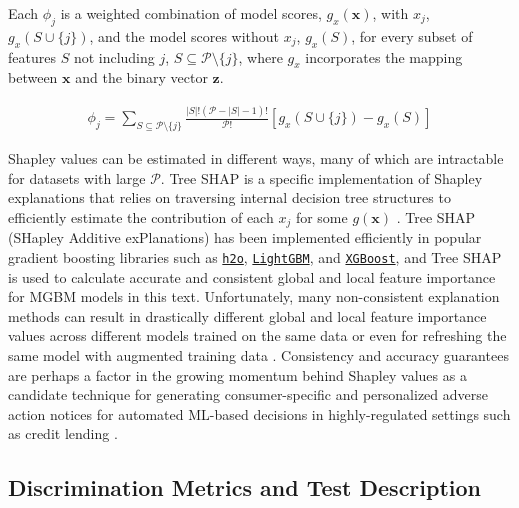 \documentclass[information,article,submit,moreauthors,pdftex]{definitions/mdpi}
\begin{document}
Each $\phi_j$ is a weighted combination of model scores, $g_x(\mathbf{x})$, with $x_j$, $g_x(S \cup \{j\})$, and the model scores without $x_j$, $g_x(S)$, for every subset of features $S$ not including $j$, $S \subseteq \mathcal{P} \setminus \{j\}$, where $g_x$ incorporates the mapping between $\mathbf{x}$ and the binary vector $\mathbf{z}$. 

\begin{equation}
\label{eq:shap_contrib}
\begin{aligned}
\phi_{j} = \sum_{S \subseteq \mathcal{P} \setminus \{j\}}\frac{|S|!(\mathcal{P} -|S| -1)!}{\mathcal{P}!}[g_x(S \cup \{j\}) - g_x(S)]
\end{aligned}
\end{equation}

Shapley values can be estimated in different ways, many of which are intractable for datasets with large $\mathcal{P}$. Tree SHAP is a specific implementation of Shapley explanations that relies on traversing internal decision tree structures to efficiently estimate the contribution of each $x_j$ for some $g(\mathbf{x})$ \cite{tree_shap}. Tree SHAP (SHapley Additive exPlanations) has been implemented efficiently in popular gradient boosting libraries such as \href{http://docs.h2o.ai/h2o/latest-stable/h2o-py/docs/modeling.html#h2ogradientboostingestimator}{\texttt{h2o}}, \href{https://lightgbm.readthedocs.io/en/latest/Python-Intro.html}{\texttt{LightGBM}}, and \href{https://xgboost.readthedocs.io/en/latest/python/python_intro.html}{\texttt{XGBoost}}, and Tree SHAP is used to calculate accurate and consistent global and local feature importance for MGBM models in this text. Unfortunately, many non-consistent explanation methods can result in drastically different global and local feature importance values across different models trained on the same data or even for refreshing the same model with augmented training data \cite{molnar}. Consistency and accuracy guarantees are perhaps a factor in the growing momentum behind Shapley values as a candidate technique for generating consumer-specific and personalized adverse action notices for automated ML-based decisions in highly-regulated settings such as credit lending \cite{bracke2019machine}.

\subsection{Discrimination Metrics and Test Description}\label{ssec:di}
\end{document}
